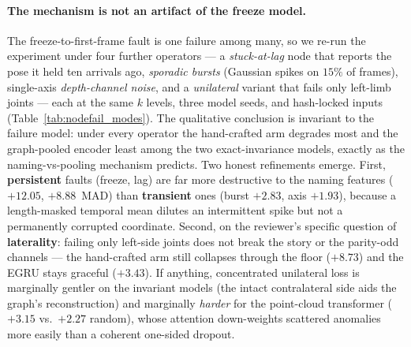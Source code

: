 \paragraph{The mechanism is not an artifact of the freeze model.} The freeze-to-first-frame fault
is one failure among many, so we re-run the experiment under four further operators --- a
\emph{stuck-at-lag} node that reports the pose it held ten arrivals ago, \emph{sporadic bursts}
(Gaussian spikes on $15\%$ of frames), single-axis \emph{depth-channel noise}, and a
\emph{unilateral} variant that fails only left-limb joints --- each at the same $k$ levels, three
model seeds, and hash-locked inputs (Table~\ref{tab:nodefail_modes}). The qualitative conclusion is
invariant to the failure model: under every operator the hand-crafted arm degrades most and the
graph-pooled encoder least among the two exact-invariance models, exactly as the naming-vs-pooling
mechanism predicts. Two honest refinements emerge. First, \textbf{persistent} faults (freeze,
lag) are far more destructive to the naming features ($+12.05$, $+8.88$~MAD) than \textbf{transient}
ones (burst $+2.83$, axis $+1.93$), because a length-masked temporal mean dilutes an intermittent
spike but not a permanently corrupted coordinate. Second, on the reviewer's specific question of
\textbf{laterality}: failing only left-side joints does not break the story or the parity-odd
channels --- the hand-crafted arm still collapses through the floor ($+8.73$) and the EGRU stays
graceful ($+3.43$). If anything, concentrated unilateral loss is marginally gentler on the invariant
models (the intact contralateral side aids the graph's reconstruction) and marginally \emph{harder}
for the point-cloud transformer ($+3.15$ vs.\ $+2.27$ random), whose attention down-weights scattered
anomalies more easily than a coherent one-sided dropout.

